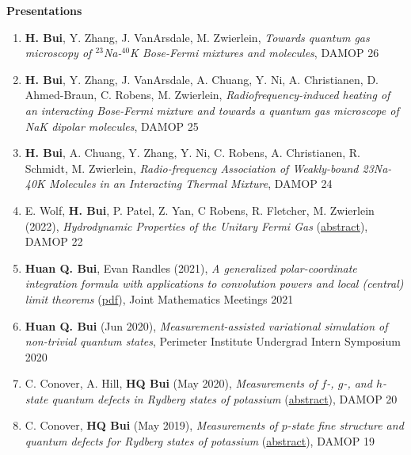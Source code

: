 \documentclass[10pt]{article}
\begin{document}

\noindent \large{\textbf{{Presentations}}}  \normalsize 

\begin{enumerate}
	\setlength\itemsep{-0pt}
	\item \textbf{H. Bui}, Y. Zhang, J. VanArsdale, M. Zwierlein, \textit{Towards quantum gas microscopy of $^{23}$Na-$^{40}$K Bose-Fermi mixtures and molecules}, DAMOP 26
	
	\item \textbf{H. Bui}, Y. Zhang, J. VanArsdale, A. Chuang, Y. Ni, A. Christianen, D. Ahmed-Braun, C. Robens, M. Zwierlein, \textit{Radiofrequency-induced heating of an interacting Bose-Fermi mixture and towards a quantum gas microscope of NaK dipolar molecules}, DAMOP 25
	
	\item \textbf{H. Bui}, A. Chuang, Y. Zhang, Y. Ni, C. Robens, A. Christianen, R. Schmidt, M. Zwierlein, \textit{Radio-frequency Association of Weakly-bound 23Na-40K Molecules in an Interacting Thermal Mixture}, DAMOP 24
	
	\item E. Wolf, \textbf{H. Bui}, P. Patel, Z. Yan, C Robens, R. Fletcher, M. Zwierlein (2022), \textit{Hydrodynamic Properties of the Unitary Fermi Gas} (\href{https://meetings.aps.org/Meeting/DAMOP22/Session/N01.49}{abstract}), DAMOP 22
	
	\item \textbf{Huan Q. Bui}, Evan Randles (2021), \textit{A generalized polar-coordinate integration formula with applications to convolution powers and local (central) limit theorems} (\href{https://jointmathematicsmeetings.org/amsmtgs/2247_abstracts/1163-42-1122.pdf}{{pdf}}), Joint Mathematics Meetings 2021
	
	\item \textbf{Huan Q. Bui} (Jun 2020), \textit{Measurement-assisted variational simulation of non-trivial quantum states},
	Perimeter Institute Undergrad Intern Symposium 2020
	
	\item C. Conover, A. Hill, \textbf{HQ Bui} (May 2020), \textit{Measurements of $f$-, $g$-, and $h$-state quantum defects in Rydberg states of potassium} (\href{http://meetings.aps.org/Meeting/DAMOP20/Session/K01.17}{abstract}),  DAMOP 20
	
	\item C. Conover, \textbf{HQ Bui} (May 2019), \textit{Measurements of $p$-state fine structure and quantum defects for Rydberg states of potassium} (\href{https://ui.adsabs.harvard.edu/abs/2019APS..DMPL01169C/abstract}{{abstract}}), DAMOP 19
	

\end{enumerate}
\end{document}
